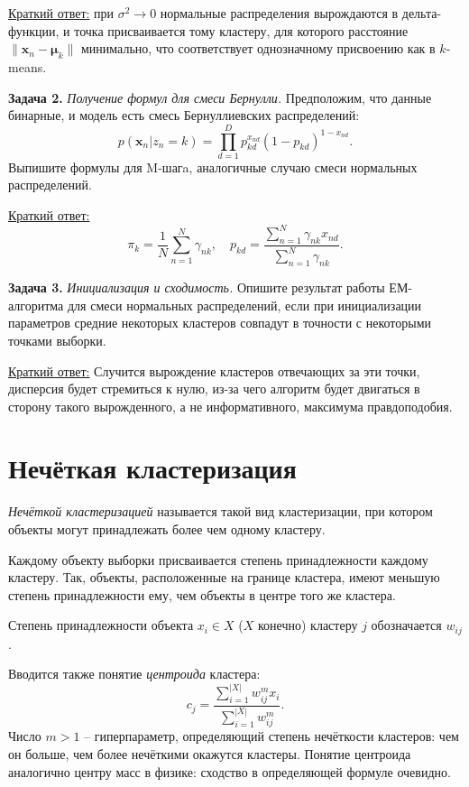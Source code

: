 \underline{Краткий ответ:} при $\sigma^2 \to 0$ нормальные распределения вырождаются в дельта-функции, и точка присваивается тому кластеру, для которого расстояние $\|\mathbf{x}_n - \boldsymbol{\mu}_k\|$ минимально, что соответствует однозначному присвоению как в $k$-means.

\noindent\textbf{Задача 2.} \emph{Получение формул для смеси Бернулли.}  
Предположим, что данные бинарные, и модель есть смесь Бернуллиевских распределений:
\begin{equation*}
p(\mathbf{x}_n | z_n = k) = \prod_{d=1}^D p_{kd}^{x_{nd}}(1 - p_{kd})^{1-x_{nd}}.
\end{equation*}
Выпишите формулы для M-шагa, аналогичные случаю смеси нормальных распределений.

\underline{Краткий ответ:}
\begin{equation*}
\pi_k = \frac{1}{N}\sum_{n=1}^N \gamma_{nk}, \quad p_{kd} = \frac{\sum_{n=1}^N \gamma_{nk} x_{nd}}{\sum_{n=1}^N \gamma_{nk}}.
\end{equation*}

\noindent\textbf{Задача 3.} \emph{Инициализация и сходимость.}  
Опишите результат работы ЕМ-алгоритма для смеси нормальных распределений, если при инициализации параметров средние некоторых кластеров совпадут в точности с некоторыми точками выборки.

\underline{Краткий ответ:} Случится вырождение кластеров отвечающих за эти точки, дисперсия будет стремиться к нулю, из-за чего алгоритм будет двигаться в сторону такого вырожденного, а не информативного, максимума правдоподобия.


\section{Нечёткая кластеризация}

\textit{Нечёткой кластеризацией} называется такой вид кластеризации, при котором объекты могут
принадлежать более чем одному кластеру.

Каждому объекту выборки присваивается степень принадлежности каждому кластеру. Так, объекты,
расположенные на границе кластера, имеют меньшую степень принадлежности ему, чем объекты в центре
того же кластера.

Степень принадлежности объекта $x_i \in X$ ($X$ конечно) кластеру $j$ обозначается $w_{ij}$.

Вводится также понятие \textit{центроида} кластера:
\begin{equation}\label{fuzzy-clustering-centroid}
    c_j = \frac{\sum\limits_{i = 1}^{|X|} w_{ij}^{m} x_i}{\sum\limits_{i = 1}^{|X|} w_{ij}^{m}}.
\end{equation}
Число $m > 1$ -- гиперпараметр, определяющий степень нечёткости кластеров: чем он больше, чем более
нечёткими окажутся кластеры. Понятие центроида аналогично центру масс в физике: сходство в
определяющей формуле очевидно.

